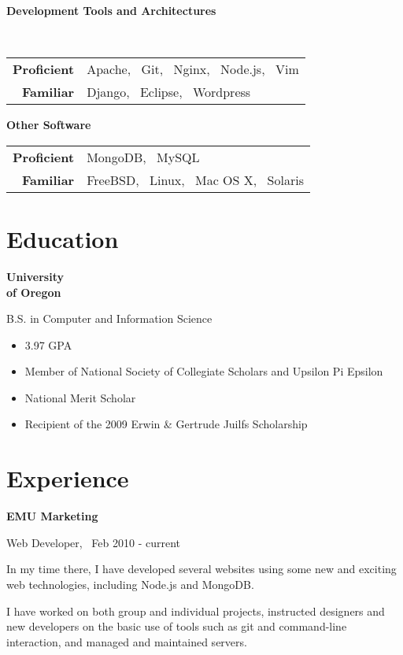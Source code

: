 \documentclass[10pt,letterpaper]{article}
\newenvironment{topic}[1]{
\begin{minipage}[t]{0.15\linewidth}\begin{flushleft}\begin{flushright}\textbf{#1}\end{flushright}\end{flushleft}\end{minipage}\hspace{1em}\vrule\hspace{1em}\begin{minipage}[t]{0.80\linewidth}\begin{flushright}\begin{flushleft}
}{
\end{flushleft}\end{flushright}\end{minipage}\vspace{1em}
}
\begin{document}
\begin{topic}{\textnormal{Development Tools and Architectures}} \hfill \\
  \begin{tabular}{r l}
    \textbf{Proficient} & Apache, \ Git, \ Nginx, \ Node.js, \ Vim \\
    \textbf{Familiar} &  Django, \ Eclipse, \ Wordpress
  \end{tabular}
  \newline
\end{topic}

\begin{topic}{\textnormal{Other Software}}
  \begin{tabular}{r l}
    \textbf{Proficient} &  MongoDB, \ MySQL \\
    \textbf{Familiar} & FreeBSD, \ Linux, \ Mac OS X, \ Solaris
  \end{tabular}
\end{topic}

\section{Education}
\begin{topic}{University \\ of Oregon}
  B.S. in Computer and Information Science
  \begin{itemize}
    \setlength{\itemsep}{0em}
    \setlength{\parskip}{0em}
    \item 3.97 GPA
    \item Member of National Society of Collegiate Scholars and Upsilon Pi Epsilon
    \item National Merit Scholar
    \item Recipient of the 2009 Erwin \& Gertrude Juilfs Scholarship
  \end{itemize}
\end{topic}

\section{Experience}
\begin{topic}{EMU Marketing}

  Web Developer, \ Feb 2010 - current

  \vspace{1em}
  
  In my time there, I have developed several websites using some new and
  exciting web technologies, including Node.js and MongoDB.

  \vspace{1em}
  
  I have worked on both group and individual projects, instructed designers and
  new developers on the basic use of tools such as git and command-line
  interaction, and managed and maintained servers.
\end{topic}
\end{document}
